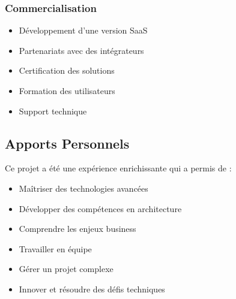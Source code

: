 \documentclass[12pt,a4paper]{article}
\begin{document}
\subsubsection{Commercialisation}
\begin{itemize}
    \item Développement d'une version SaaS
    \item Partenariats avec des intégrateurs
    \item Certification des solutions
    \item Formation des utilisateurs
    \item Support technique
\end{itemize}

\subsection{Apports Personnels}

Ce projet a été une expérience enrichissante qui a permis de :
\begin{itemize}
    \item Maîtriser des technologies avancées
    \item Développer des compétences en architecture
    \item Comprendre les enjeux business
    \item Travailler en équipe
    \item Gérer un projet complexe
    \item Innover et résoudre des défis techniques
\end{itemize}
\end{document}

